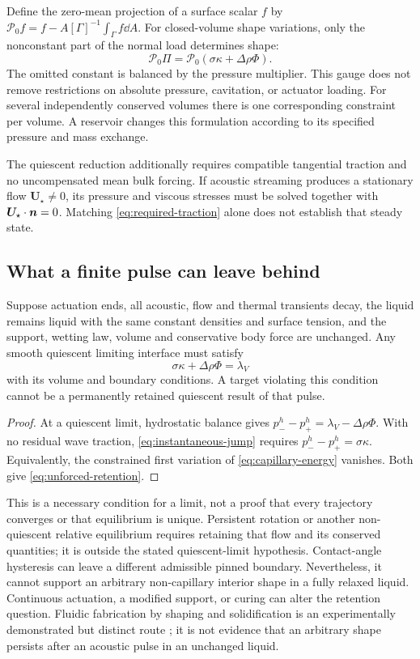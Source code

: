Define the zero-mean projection of a surface scalar $f$ by
$\mathcal P_0f=f-A[\Gamma]^{-1}\int_\Gamma f\dd A$. For closed-volume shape
variations, only the nonconstant part of the normal load determines shape:
\begin{equation}
 \mathcal P_0\Pi=\mathcal P_0(\sigma\kappa+\Delta\rho\Phi).
 \label{eq:pressure-gauge}
\end{equation}
The omitted constant is balanced by the pressure multiplier. This gauge does
not remove restrictions on absolute pressure, cavitation, or actuator loading.
For several independently conserved volumes there is one corresponding
constraint per volume. A reservoir changes this formulation according to its
specified pressure and mass exchange.

The quiescent reduction additionally requires compatible tangential traction
and no uncompensated mean bulk forcing. If acoustic streaming produces a
stationary flow $\bm U_\star\ne0$, its pressure and viscous stresses must be
solved together with $\bm U_\star\cdot\bm n=0$. Matching
\cref{eq:required-traction} alone does not establish that steady state.

\subsection{What a finite pulse can leave behind}
\begin{proposition}
Suppose actuation ends, all acoustic, flow and thermal transients decay, the
liquid remains liquid with the same constant densities and surface tension,
and the support, wetting law, volume and conservative body force are unchanged.
Any smooth quiescent limiting interface must satisfy
\begin{equation}
 \sigma\kappa+\Delta\rho\Phi=\lambda_V
 \label{eq:unforced-retention}
\end{equation}
with its volume and boundary conditions. A target violating this condition
cannot be a permanently retained quiescent result of that pulse.
\end{proposition}
\begin{proof}
At a quiescent limit, hydrostatic balance gives
$p^h_- -p^h_+=\lambda_V-\Delta\rho\Phi$. With no residual wave traction,
\cref{eq:instantaneous-jump} requires $p^h_- -p^h_+=\sigma\kappa$.
Equivalently, the constrained first variation of \cref{eq:capillary-energy}
vanishes. Both give \cref{eq:unforced-retention}.
\end{proof}
This is a necessary condition for a limit, not a proof that every trajectory
converges or that equilibrium is unique. Persistent rotation or another
non-quiescent relative equilibrium requires retaining that flow and its
conserved quantities; it is outside the stated quiescent-limit hypothesis.
Contact-angle hysteresis can leave a
different admissible pinned boundary. Nevertheless, it cannot support an
arbitrary non-capillary interior shape in a fully relaxed liquid. Continuous
actuation, a modified support, or curing can alter the retention question.
Fluidic fabrication by shaping and solidification is an experimentally
demonstrated but distinct route \cite{elgarisi2021}; it is not evidence that
an arbitrary shape persists after an acoustic pulse in an unchanged liquid.
